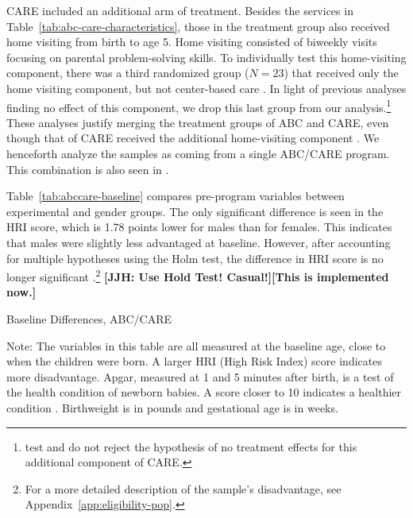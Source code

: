 CARE included an additional arm of treatment. Besides the services in Table~\ref{tab:abc-care-characteristics}, those in the treatment group also received home visiting from birth to age 5. Home visiting consisted of biweekly visits focusing on parental problem-solving skills. To individually test this home-visiting component, there was a third randomized group ($N=23$) that received only the home visiting component, but not center-based care \citep{Wasik_Ramey_etal_1990_CD}. In light of previous analyses finding no effect of this component, we drop this last group from our analysis.\footnote{\citet{Campbell_Conti_etal_2014_EarlyChildhoodInvestments} test and do not reject the hypothesis of no treatment effects for this additional component of CARE.} These analyses justify merging the treatment groups of ABC and CARE, even though that of CARE received the additional home-visiting component \citep{ABCCARE_Dataset}. We henceforth analyze the samples as coming from a single ABC/CARE program. This combination is also seen in \citet{Burchinal_etal_2006_MSRCD_IV-Growth-Curve}.

Table~\ref{tab:abccare-baseline} compares pre-program variables between experimental and gender groups. The only significant difference is seen in the HRI score, which is 1.78 points lower for males than for females. This indicates that males were slightly less advantaged at baseline. However, after accounting for multiple hypotheses using the Holm test, the difference in HRI score is no longer significant \citep{Holme_1979_Sequential_SJS}.\footnote{For a more detailed description of the sample's disadvantage, see Appendix~\ref{app:eligibility-pop}.} \textbf{[JJH: Use Hold Test! Casual!][This is implemented now.]}

\begin{table}[!htbp]
\centering
\caption{Baseline Differences, ABC/CARE}
\label{tab:abccare-baseline}
\begin{threeparttable}
	
\begin{tablenotes}
\footnotesize
\item Note: The variables in this table are all measured at the baseline age, close to when the children were born. A larger HRI (High Risk Index) score indicates more disadvantage. Apgar, measured at 1 and 5 minutes after birth, is a test of the health condition of newborn babies. A score closer to 10 indicates a healthier condition \citep{Apgar_1966_APGAR-Scoring_PCNA}. Birthweight is in pounds and gestational age is in weeks.
\end{tablenotes}
\end{threeparttable}
\end{table}

